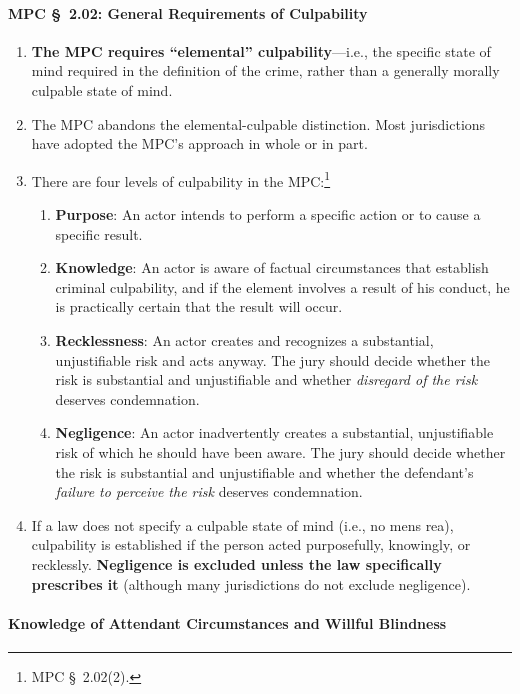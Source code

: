 \paragraph{MPC \S\ 2.02: General Requirements of Culpability}

\begin{enumerate}
    \item \textbf{The MPC requires ``elemental'' culpability}---i.e., the 
    specific state of mind required in the definition of the crime, rather 
    than a generally morally culpable state of mind.
    \item The MPC abandons the elemental-culpable distinction. Most 
    jurisdictions have adopted the MPC's approach in whole or in part.
    \item There are four levels of culpability in the MPC:\footnote{MPC \S\ 
    2.02(2).}
    \begin{enumerate}
        \item \textbf{Purpose}: An actor intends to perform a specific action 
        or to cause a specific result.
        \item \textbf{Knowledge}: An actor is aware of factual circumstances 
        that establish criminal culpability, and if the element involves a 
        result of his conduct, he is practically certain that the result will 
        occur.
        \item \textbf{Recklessness}: An actor creates and recognizes a 
        substantial, unjustifiable risk and acts anyway. The jury should 
        decide whether the risk is substantial and unjustifiable and whether 
        \emph{disregard of the risk} deserves condemnation.
        \item \textbf{Negligence}: An actor inadvertently creates a 
        substantial, unjustifiable risk of which he should have been aware. 
        The jury should decide whether the risk is substantial and 
        unjustifiable and whether the defendant's \emph{failure to perceive 
        the risk} deserves condemnation.
    \end{enumerate}
    \item If a law does not specify a culpable state of mind (i.e., no mens 
    rea), culpability is established if the person acted purposefully, 
    knowingly, or recklessly. \textbf{Negligence is excluded unless the law 
    specifically prescribes it} (although many jurisdictions do not exclude 
    negligence).
\end{enumerate}

\paragraph{Knowledge of Attendant Circumstances and Willful Blindness}

